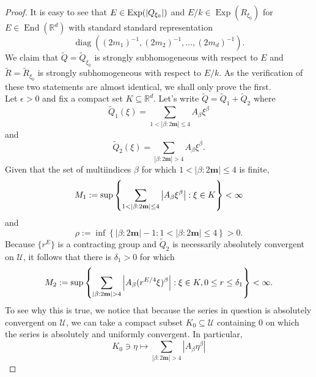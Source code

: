 \documentclass[11pt]{article}
\theoremstyle{remark}
\newcommand\End{\operatorname{End}} %
\newcommand\Exp{\operatorname{Exp}}
\newcommand\diag{\operatorname{diag}}
\begin{document}
\begin{proof}
It is easy to see that $E\in \Exp(\abs{Q_{\xi_0}})$ and $E/k\in\Exp(R_{\xi_0})$ for $E\in\End(\mathbb{R}^d)$ with standard standard representation 
\begin{equation*}
\diag((2m_1)^{-1}, (2m_2)^{-1},\dots, (2m_d)^{-1}).
\end{equation*}
We claim that $\widetilde{Q}=\widetilde{Q}_{\xi_0}$ is strongly subhomogeneous with respect to $E$ and $\widetilde{R}=\widetilde{R}_{\xi_0}$ is strongly subhomogeneous with respect to $E/k$. As the verification of these two statements are almost identical, we shall only prove the first.\\

\noindent Let $\epsilon > 0$ and fix a compact set $K\subseteq\mathbb{R}^d$. Let's write $\widetilde{Q}=\widetilde{Q}_1+\widetilde{Q}_2$ where
\begin{equation*}
    \widetilde{Q}_1(\xi)=\sum_{1< |\beta:2\mathbf{m}|\leq 4}A_{\beta}\xi^\beta
\end{equation*}
and
\begin{equation*}
    \widetilde{Q}_2(\xi)=\sum_{ |\beta:2\mathbf{m}|>4}A_{\beta}\xi^\beta.
\end{equation*}
Given that the set of multiindices $\beta$ for which  $1<|\beta:2\mathbf{m}|\leq 4$ is finite, 
\begin{equation*}
    M_1:=\sup\left\{\sum_{1<|\beta:2\mathbf{m}|\leq 4} \abs{A_\beta\xi^\beta}:\xi\in K\right\}<\infty
\end{equation*}
and
\begin{equation*}
    \rho:=\inf\left\{|\beta:2\mathbf{m}|-1:1<|\beta:2\mathbf{m}|\leq 4\right\}>0.
\end{equation*}
Because $\{r^E\}$ is a contracting group and $\widetilde{Q}_2$ is necessarily absolutely convergent on $\mathcal{U}$, it follows that there is $\delta_1>0$ for which
\begin{equation*}
    M_2:=\sup\left\{\sum_{|\beta:2\mathbf{m}|>4}\abs{A_\beta(r^{E/4}\xi)^\beta}:\xi\in K, 0\leq r\leq\delta_1\right\}<\infty.
\end{equation*}
To see why this is true, we notice that because the series in question is absolutely convergent on $\mathcal{U}$, we can take a compact subset $K_0 \subseteq \mathcal{U}$ containing $0$ on which the series is absolutely and uniformly convergent. In particular, 
\begin{equation*}
    K_0 \ni \eta \mapsto \sum_{|\beta:2\mathbf{m}|>4}|A_{\beta}\eta^\beta|
\end{equation*}

\end{proof}
\end{document}
